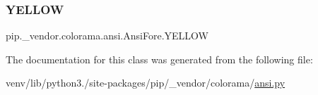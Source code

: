 \subsubsection{\texorpdfstring{Y\+E\+L\+L\+OW}{YELLOW}}
{\footnotesize\ttfamily pip.\+\_\+vendor.\+colorama.\+ansi.\+Ansi\+Fore.\+Y\+E\+L\+L\+OW\hspace{0.3cm}{\ttfamily [static]}}



The documentation for this class was generated from the following file\+:\begin{DoxyCompactItemize}
\item 
venv/lib/python3./site-\/packages/pip/\+\_\+vendor/colorama/\hyperlink{ansi_8py}{ansi.\+py}\end{DoxyCompactItemize}
